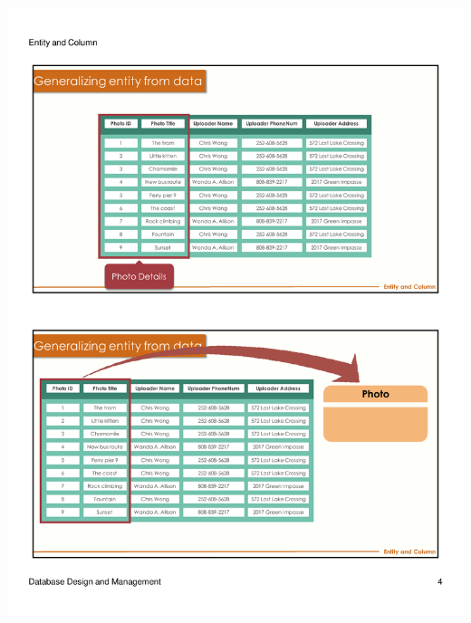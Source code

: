 \begin{frame}{ }
    \centering
    \includegraphics[width=\textwidth, trim={10mm 134mm 10mm 22mm}, clip]{resources/02/02_4}
\end{frame}
